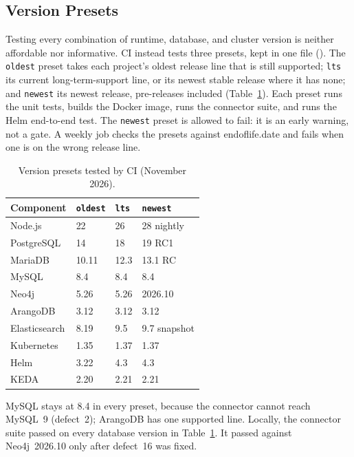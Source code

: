 \documentclass[sigconf,nonacm]{acmart}
\begin{document}
\subsection{Version Presets}
\label{sec:eval-versions}

Testing every combination of runtime, database, and cluster version is
neither affordable nor informative.  CI instead tests three presets,
kept in one file ().  The \texttt{oldest}
preset takes each project's oldest release line that is still
supported; \texttt{lts} its current long-term-support line, or its
newest stable release where it has none; and \texttt{newest} its newest
release, pre-releases included (Table~\ref{tab:presets}).  Each preset
runs the unit tests, builds the Docker image, runs the connector suite,
and runs the Helm end-to-end test.  The \texttt{newest} preset is
allowed to fail: it is an early warning, not a gate.  A weekly job
checks the presets against endoflife.date and fails when one is on the
wrong release line.

\begin{table}[tb]
\caption{Version presets tested by CI (November 2026).}
\label{tab:presets}
\small
\begin{tabular}{llll}
\toprule
Component & \texttt{oldest} & \texttt{lts} & \texttt{newest} \\
\midrule
Node.js & 22 & 26 & 28 nightly \\
PostgreSQL & 14 & 18 & 19 RC1 \\
MariaDB & 10.11 & 12.3 & 13.1 RC \\
MySQL & 8.4 & 8.4 & 8.4 \\
Neo4j & 5.26 & 5.26 & 2026.10 \\
ArangoDB & 3.12 & 3.12 & 3.12 \\
Elasticsearch & 8.19 & 9.5 & 9.7 snapshot \\
Kubernetes & 1.35 & 1.37 & 1.37 \\
Helm & 3.22 & 4.3 & 4.3 \\
KEDA & 2.20 & 2.21 & 2.21 \\
\bottomrule
\end{tabular}
\end{table}

MySQL stays at 8.4 in every preset, because the connector cannot reach
MySQL~9 (defect~2); ArangoDB has one supported line.  Locally, the
connector suite passed on every database version in
Table~\ref{tab:presets}.  It passed against Neo4j~2026.10 only after
defect~16 was fixed.
\end{document}
